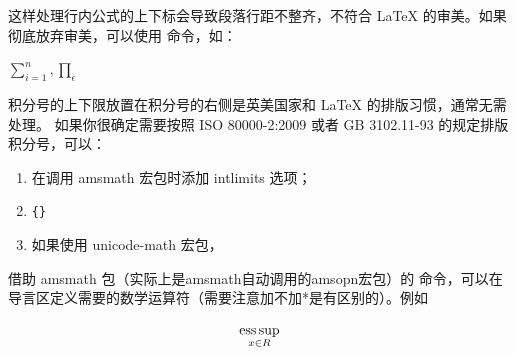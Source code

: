 


这样处理行内公式的上下标会导致段落行距不整齐，不符合 \LaTeX{}
的审美。如果彻底放弃审美，可以使用  命令，如：

\begin{example}
$\sum\limits_{i=1}^n, \prod\limits_\epsilon$
\end{example}



积分号的上下限放置在积分号的右侧是英美国家和 \LaTeX{}
的排版习惯，通常无需处理。
如果你很确定需要按照 ISO 80000-2:2009 或者 GB 3102.11-93 的规定排版积分号，可以：

\begin{enumerate}
\def\labelenumi{\arabic{enumi}.}

\item
  在调用 amsmath 宏包时添加 intlimits 选项；
\item
  \texttt{\{\}}
\item
  如果使用 unicode-math 宏包，
\end{enumerate}

\begin{texlist}
\removenolimits{%
  \int\iint\iiint\iiiint\oint\oiint\oiiint
  \intclockwise\varointclockwise\ointctrclockwise\sumint
  \intbar\intBar\fint\cirfnint\awint\rppolint
  \scpolint\npolint\pointint\sqint\intlarhk\intx
  \intcap\intcup\upint\lowint
}
\end{texlist}



借助 amsmath 包（实际上是amsmath自动调用的amsopn宏包）的
 命令，可以在导言区定义需要的数学运算符（需要注意加不加*是有区别的）。例如

\begin{texlist}
\DeclareMathOperator*{\esssup}{ess\,sup}
\end{texlist}

\begin{example}
\[ 
  \esssup_{x\in {R}} 
\]
\end{example}


